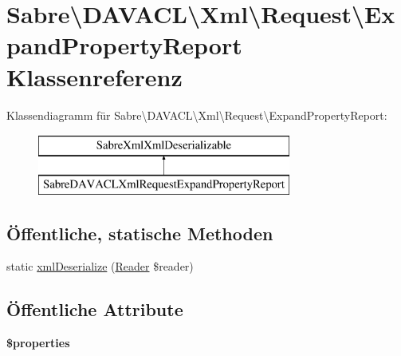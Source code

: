 \hypertarget{class_sabre_1_1_d_a_v_a_c_l_1_1_xml_1_1_request_1_1_expand_property_report}{}\section{Sabre\textbackslash{}D\+A\+V\+A\+CL\textbackslash{}Xml\textbackslash{}Request\textbackslash{}Expand\+Property\+Report Klassenreferenz}
\label{class_sabre_1_1_d_a_v_a_c_l_1_1_xml_1_1_request_1_1_expand_property_report}
Klassendiagramm für Sabre\textbackslash{}D\+A\+V\+A\+CL\textbackslash{}Xml\textbackslash{}Request\textbackslash{}Expand\+Property\+Report\+:\begin{figure}[H]
\begin{center}
\leavevmode
\includegraphics[height=2.000000cm]{class_sabre_1_1_d_a_v_a_c_l_1_1_xml_1_1_request_1_1_expand_property_report}
\end{center}
\end{figure}
\subsection*{Öffentliche, statische Methoden}
\begin{DoxyCompactItemize}
\item 
static \mbox{\hyperlink{class_sabre_1_1_d_a_v_a_c_l_1_1_xml_1_1_request_1_1_expand_property_report_aff738789b351770eee96e261a43a8060}{xml\+Deserialize}} (\mbox{\hyperlink{class_sabre_1_1_xml_1_1_reader}{Reader}} \$reader)
\end{DoxyCompactItemize}
\subsection*{Öffentliche Attribute}
\begin{DoxyCompactItemize}
\item 
\mbox{\label{class_sabre_1_1_d_a_v_a_c_l_1_1_xml_1_1_request_1_1_expand_property_report_af6d5b0d85dedb9139fbc2d455b43eb28}} 
{\bfseries \$properties}
\end{DoxyCompactItemize}


